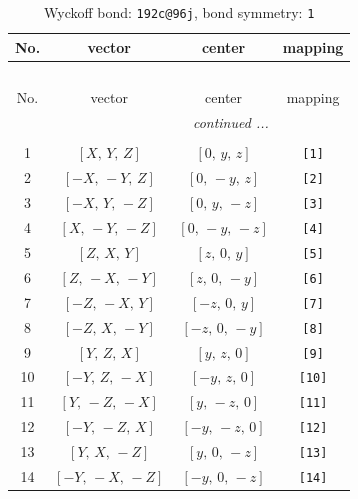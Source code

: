\documentclass[fleqn,8pt]{jsarticle}
\begin{document}
\begin{longtable}{cccc}
\caption{Wyckoff bond: {\tt 192c@96j}, bond symmetry: {\tt 1}}
 \\
 \hline \hline
No. & vector & center & mapping \\ \hline \endfirsthead

\multicolumn{3}{l}{\tablename\ \thetable{}} \\
 \hline \hline
No. & vector & center & mapping \\ \hline \endhead

 \hline \hline
\multicolumn{3}{r}{\footnotesize\it continued ...} \\ \endfoot

 \hline \hline
\multicolumn{3}{r}{} \\ \endlastfoot

1 & $\left[ X,\, Y,\, Z \right]$ & $\left[ 0,\, y,\, z \right]$ & {\tt [1]} \\ \hline
2 & $\left[ - X,\, - Y,\, Z \right]$ & $\left[ 0,\, - y,\, z \right]$ & {\tt [2]} \\ \hline
3 & $\left[ - X,\, Y,\, - Z \right]$ & $\left[ 0,\, y,\, - z \right]$ & {\tt [3]} \\ \hline
4 & $\left[ X,\, - Y,\, - Z \right]$ & $\left[ 0,\, - y,\, - z \right]$ & {\tt [4]} \\ \hline
5 & $\left[ Z,\, X,\, Y \right]$ & $\left[ z,\, 0,\, y \right]$ & {\tt [5]} \\ \hline
6 & $\left[ Z,\, - X,\, - Y \right]$ & $\left[ z,\, 0,\, - y \right]$ & {\tt [6]} \\ \hline
7 & $\left[ - Z,\, - X,\, Y \right]$ & $\left[ - z,\, 0,\, y \right]$ & {\tt [7]} \\ \hline
8 & $\left[ - Z,\, X,\, - Y \right]$ & $\left[ - z,\, 0,\, - y \right]$ & {\tt [8]} \\ \hline
9 & $\left[ Y,\, Z,\, X \right]$ & $\left[ y,\, z,\, 0 \right]$ & {\tt [9]} \\ \hline
10 & $\left[ - Y,\, Z,\, - X \right]$ & $\left[ - y,\, z,\, 0 \right]$ & {\tt [10]} \\ \hline
11 & $\left[ Y,\, - Z,\, - X \right]$ & $\left[ y,\, - z,\, 0 \right]$ & {\tt [11]} \\ \hline
12 & $\left[ - Y,\, - Z,\, X \right]$ & $\left[ - y,\, - z,\, 0 \right]$ & {\tt [12]} \\ \hline
13 & $\left[ Y,\, X,\, - Z \right]$ & $\left[ y,\, 0,\, - z \right]$ & {\tt [13]} \\ \hline
14 & $\left[ - Y,\, - X,\, - Z \right]$ & $\left[ - y,\, 0,\, - z \right]$ & {\tt [14]} \\ \hline

\end{longtable}
\end{document}
